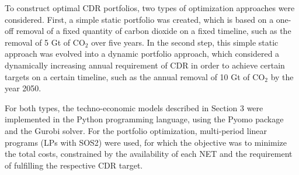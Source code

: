 




To construct optimal CDR portfolios, two types of optimization approaches were considered. First, a simple static portfolio was created, which is based on a one-off removal of a fixed quantity of carbon dioxide on a fixed timeline, such as the removal of 5 Gt of CO$_2$ over five years. In the second step, this simple static approach was evolved into a dynamic portfolio approach, which considered a dynamically increasing annual requirement of CDR in order to achieve certain targets on a certain timeline, such as the annual removal of 10 Gt of CO$_2$ by the year 2050.\vspace{2mm}

For both types, the techno-economic models described in Section 3 were implemented in the Python programming language, using the Pyomo package and the Gurobi solver. For the portfolio optimization, multi‑period linear programs (LPs with SOS2) were used, for which the objective was to minimize the total costs, constrained by the availability of each NET and the requirement of fulfilling the respective CDR target.\vspace{2mm}

